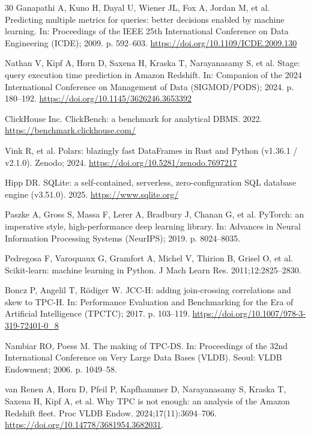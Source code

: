 \documentclass[10pt,a4paper]{article}
\begin{document}
{\begin{thebibliography}{30}
Ganapathi A, Kuno H, Dayal U, Wiener JL, Fox A, Jordan M, et al. Predicting multiple metrics for queries: better decisions enabled by machine learning. In: Proceedings of the IEEE 25th International Conference on Data Engineering (ICDE); 2009. p. 592--603. \url{https://doi.org/10.1109/ICDE.2009.130}

Nathan V, Kipf A, Horn D, Saxena H, Kraska T, Narayanasamy S, et al. Stage: query execution time prediction in Amazon Redshift. In: Companion of the 2024 International Conference on Management of Data (SIGMOD/PODS); 2024. p. 180--192. \url{https://doi.org/10.1145/3626246.3653392}

ClickHouse Inc. ClickBench: a benchmark for analytical DBMS. 2022. \url{https://benchmark.clickhouse.com/}

Vink R, et al. Polars: blazingly fast DataFrames in Rust and Python (v1.36.1 / v2.1.0). Zenodo; 2024. \url{https://doi.org/10.5281/zenodo.7697217}

Hipp DR. SQLite: a self-contained, serverless, zero-configuration SQL database engine (v3.51.0). 2025. \url{https://www.sqlite.org/}

Paszke A, Gross S, Massa F, Lerer A, Bradbury J, Chanan G, et al. PyTorch: an imperative style, high-performance deep learning library. In: Advances in Neural Information Processing Systems (NeurIPS); 2019. p. 8024--8035.

Pedregosa F, Varoquaux G, Gramfort A, Michel V, Thirion B, Grisel O, et al. Scikit-learn: machine learning in Python. J Mach Learn Res. 2011;12:2825--2830.

Boncz P, Angelil T, R{\"o}diger W. JCC-H: adding join-crossing correlations and skew to TPC-H. In: Performance Evaluation and Benchmarking for the Era of Artificial Intelligence (TPCTC); 2017. p. 103--119. \url{https://doi.org/10.1007/978-3-319-72401-0_8}

Nambiar RO, Poess M. The making of TPC-DS. In: Proceedings of the 32nd International Conference on Very Large Data Bases (VLDB). Seoul: VLDB Endowment; 2006. p. 1049--58.

van Renen A, Horn D, Pfeil P, Kapfhammer D, Narayanasamy S, Kraska T, Saxena H, Kipf A, et al. Why TPC is not enough: an analysis of the Amazon Redshift fleet. Proc VLDB Endow. 2024;17(11):3694--706. \url{https://doi.org/10.14778/3681954.3682031}.


\end{thebibliography}}
\end{document}
